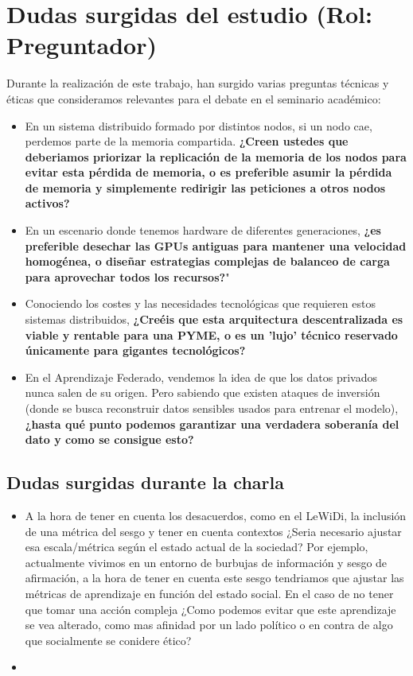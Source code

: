 \documentclass[runningheads]{llncs}
\begin{document}
\section{Dudas surgidas del estudio (Rol: Preguntador)}
Durante la realización de este trabajo, han surgido varias preguntas técnicas y éticas que consideramos relevantes para el debate en el seminario académico:
\begin{itemize}
    \item En un sistema distribuido formado por distintos nodos, si un nodo cae, perdemos parte de la memoria compartida. \textbf{¿Creen ustedes que deberiamos priorizar la replicación de la memoria de los nodos para evitar esta pérdida de memoria, o es preferible asumir la pérdida de memoria y simplemente redirigir las peticiones a otros nodos activos?}
    \newline
    \item En un escenario donde tenemos hardware de diferentes generaciones, \textbf{¿es preferible desechar las GPUs antiguas para mantener una velocidad homogénea, o diseñar estrategias complejas de balanceo de carga para aprovechar todos los recursos?}"
    \newline
    \item Conociendo los costes y las necesidades tecnológicas que requieren estos sistemas distribuidos, \textbf{¿Creéis que esta arquitectura descentralizada es viable y rentable para una PYME, o es un 'lujo' técnico reservado únicamente para gigantes tecnológicos?}
    \newline
    \item En el Aprendizaje Federado, vendemos la idea de que los datos privados nunca salen de su origen. Pero sabiendo que existen ataques de inversión (donde se busca reconstruir datos sensibles usados para entrenar el modelo), \textbf{¿hasta qué punto podemos garantizar una verdadera soberanía del dato y como se consigue esto?}
    \newline
\end{itemize}

\subsection{Dudas surgidas durante la charla}
\begin{itemize}
    \item A la hora de tener en cuenta los desacuerdos, como en el LeWiDi, la inclusión de una métrica del sesgo y tener en cuenta contextos ¿Seria necesario ajustar esa escala/métrica según el estado actual de la sociedad? Por ejemplo, actualmente vivimos en un entorno de burbujas de información y sesgo de afirmación, a la hora de tener en cuenta este sesgo tendriamos que ajustar las métricas de aprendizaje en función del estado social. En el caso de no tener que tomar una acción compleja ¿Como podemos evitar que este aprendizaje se vea alterado, como mas afinidad por un lado político o en contra de algo que socialmente se conidere ético?
    \newline
    \item 

\end{itemize}
\end{document}
